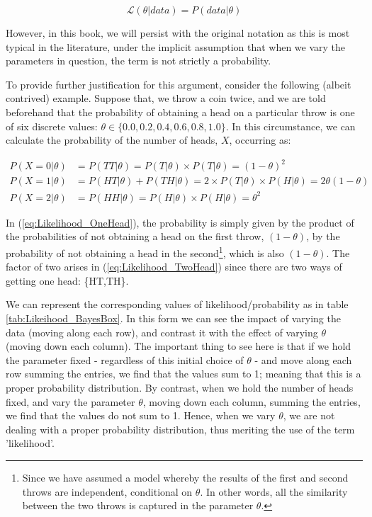 \documentclass[11pt,fullpage]{book}
\begin{document}
\begin{equation}
\mathcal{L}(\theta|data) = P(data|\theta)
\end{equation}\label{eq:Likelihood_notation}

However, in this book, we will persist with the original notation as this is most typical in the literature, under the implicit assumption that when we vary the parameters in question, the term is not strictly a probability.

To provide further justification for this argument, consider the following (albeit contrived) example. Suppose that, we throw a coin twice, and we are told beforehand that the probability of obtaining a head on a particular throw is one of six discrete values: $\theta\in\{0.0,0.2,0.4,0.6,0.8,1.0\}$. In this circumstance, we can calculate the probability of the number of heads, $X$, occurring as:

\begin{align}\label{eq:Likelihood_OneHead}
P(X = 0|\theta)& = P(TT|\theta) = P(T|\theta)\times P(T|\theta) = (1-\theta)^2\\
P(X = 1|\theta)& = P(HT|\theta) + P(TH|\theta) = 2\times P(T|\theta)\times P(H|\theta) = 2\theta(1-\theta)\\\label{eq:Likelihood_TwoHead}
P(X = 2|\theta)& = P(HH|\theta) = P(H|\theta)\times P(H|\theta) = \theta^2
\end{align}

In (\ref{eq:Likelihood_OneHead}), the probability is simply given by the product of the probabilities of not obtaining a head on the first throw, $(1-\theta)$, by the probability of not obtaining a head in the second\footnote{Since we have assumed a model whereby the results of the first and second throws are independent, conditional on $\theta$. In other words, all the similarity between the two throws is captured in the parameter $\theta$.}, which is also $(1-\theta)$. The factor of two arises in (\ref{eq:Likelihood_TwoHead}) since there are two ways of getting one head: \{HT,TH\}.

We can represent the corresponding values of likelihood/probability as in table \ref{tab:Likeihood_BayesBox}. In this form we can see the impact of varying the data (moving along each row), and contrast it with the effect of varying $\theta$ (moving down each column). The important thing to see here is that if we hold the parameter fixed - regardless of this initial choice of $\theta$ - and move along each row summing the entries, we find that the values sum to 1; meaning that this is a proper probability distribution. By contrast, when we hold the number of heads fixed, and vary the parameter $\theta$, moving down each column, summing the entries, we find that the values do not sum to 1. Hence, when we vary $\theta$, we are not dealing with a proper probability distribution, thus meriting the use of the term 'likelihood'.
\end{document}
